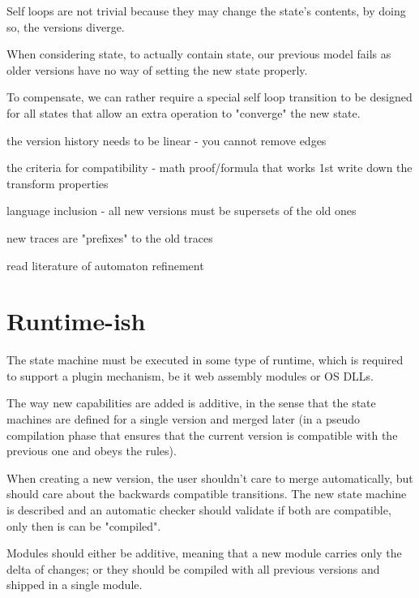 \documentclass[a4paper]{article}
\begin{document}
Self loops are not trivial because they may change the state's contents, by doing so,
the versions diverge.

When considering state, to actually contain state, our previous model fails as older
versions have no way of setting the new state properly.

To compensate, we can rather require a special self loop transition to be designed for
all states that allow an extra operation to "converge" the new state.

the version history needs to be linear - you cannot remove edges

the criteria for compatibility - math proof/formula that works
1st write down the transform properties

language inclusion - all new versions must be supersets of the old ones

new traces are "prefixes" to the old traces

read literature of automaton refinement

\section*{Runtime-ish}

The state machine must be executed in some type of runtime, which is required to support
a plugin mechanism, be it web assembly modules or OS DLLs.

The way new capabilities are added is additive, in the sense that the state machines are defined
for a single version and merged later (in a pseudo compilation phase that ensures that the current version
is compatible with the previous one and obeys the rules).

When creating a new version, the user shouldn't care to merge automatically, but should care about the
backwards compatible transitions.
The new state machine is described and an automatic checker should validate if both are
compatible, only then is can be "compiled".

Modules should either be additive, meaning that a new module carries only the delta of changes;
or they should be compiled with all previous versions and shipped in a single module.



\end{document}
